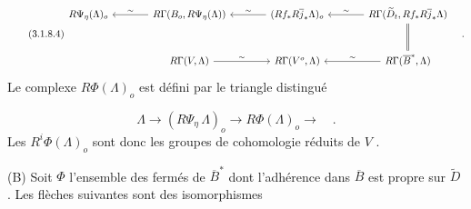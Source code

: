 \begin{equation}\tag{3.1.8.4}
\begin{tikzcd}[column sep=large, row sep=large]
R\Psi_\eta(\Lambda)_o & R\Gamma(B_o, R\Psi_\eta(\Lambda)) \arrow[l, "\sim"'] & (Rf_* R\overline{j}_* \Lambda)_o \arrow[l, "\sim"'] & R\Gamma(\widetilde{D}_t, Rf_* R\overline{j}_* \Lambda) \arrow[l, "\sim"'] \arrow[d, equal] \\
{} & R\Gamma(V, \Lambda) \arrow[r, "\sim"] & R\Gamma(V^o, \Lambda) & R\Gamma(\overline{B}^*, \Lambda) \arrow[l, "\sim"']
\end{tikzcd}\quad .
\end{equation}
Le complexe $R\Phi(\Lambda)_o$ est défini par le triangle distingué

\begin{equation*}
\Lambda \longrightarrow (R\Psi_\eta \, \Lambda)_o \longrightarrow R\Phi(\Lambda)_o \longrightarrow \quad .
\end{equation*}
Les $R^i\Phi(\Lambda)_o$ sont donc les groupes de cohomologie réduits de $V$ .

(B) Soit $\Phi$ l'ensemble des fermés de $\overline{B}^*$ dont l'adhérence dans $\overline{B}$ est propre sur $\widetilde{D}$ . Les flèches suivantes sont des isomorphismes

